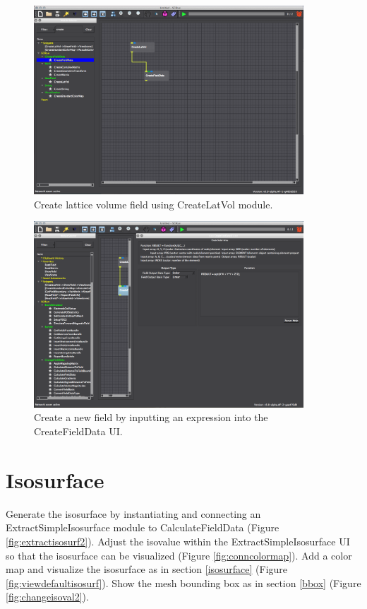 \documentclass[fleqn,11pt,openany]{book}
\begin{document}
\begin{figure}[H]
\center
\includegraphics[width=0.9\textwidth]{BasicTutorial_figures/create.png}
\caption{Create lattice volume field using CreateLatVol module.}
\label{fig:createnewfield}
\end{figure}

\begin{figure}[H]
\center
\includegraphics[width=0.9\textwidth]{BasicTutorial_figures/fielddata.png}
\caption{Create a new field by inputting an expression into the CreateFieldData UI. }
\label{fig:calcfielddata}
\end{figure}


\section{Isosurface}\label{isosurface2}

Generate the isosurface by instantiating and connecting an ExtractSimpleIsosurface module to CalculateFieldData (Figure \ref{fig:extractisosurf2}). Adjust the isovalue within the ExtractSimpleIsosurface UI so that the isosurface can be visualized (Figure \ref{fig:conncolormap}). Add a color map and visualize the isosurface as in section \ref{isosurface} (Figure \ref{fig:viewdefaultisosurf}). Show the mesh bounding box as in section \ref{bbox} (Figure \ref{fig:changeisoval2}).
\end{document}

